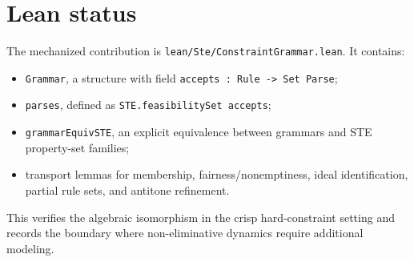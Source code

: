 \documentclass[11pt]{article}
\begin{document}
\section{Lean status}
The mechanized contribution is \texttt{lean/Ste/ConstraintGrammar.lean}.  It
contains:
\begin{itemize}
\item \texttt{Grammar}, a structure with field \texttt{accepts : Rule -> Set Parse};
\item \texttt{parses}, defined as \texttt{STE.feasibilitySet accepts};
\item \texttt{grammarEquivSTE}, an explicit equivalence between grammars and
  STE property-set families;
\item transport lemmas for membership, fairness/nonemptiness, ideal
  identification, partial rule sets, and antitone refinement.
\end{itemize}
This verifies the algebraic isomorphism in the crisp hard-constraint setting
and records the boundary where non-eliminative dynamics require additional
modeling.



\end{document}

